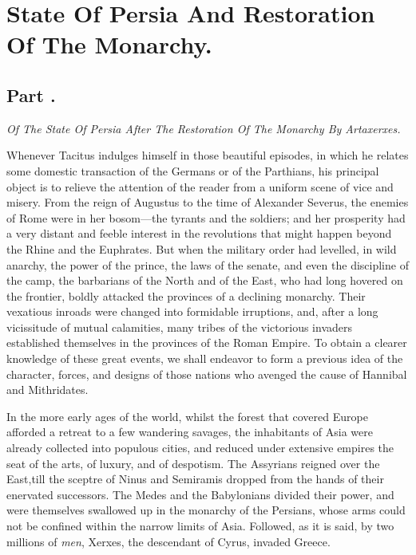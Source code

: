 \chapter{State Of Persia And Restoration Of The Monarchy.}
\section{Part \thesection.}

\textit{Of The State Of Persia After The Restoration Of The Monarchy By Artaxerxes.}
\vspace{\onelineskip}

Whenever Tacitus indulges himself in those beautiful episodes, in
which he relates some domestic transaction of the Germans or of
the Parthians, his principal object is to relieve the attention
of the reader from a uniform scene of vice and misery. From the
reign of Augustus to the time of Alexander Severus, the enemies
of Rome were in her bosom—the tyrants and the soldiers; and her
prosperity had a very distant and feeble interest in the
revolutions that might happen beyond the Rhine and the Euphrates.
But when the military order had levelled, in wild anarchy, the
power of the prince, the laws of the senate, and even the
discipline of the camp, the barbarians of the North and of the
East, who had long hovered on the frontier, boldly attacked the
provinces of a declining monarchy. Their vexatious inroads were
changed into formidable irruptions, and, after a long vicissitude
of mutual calamities, many tribes of the victorious invaders
established themselves in the provinces of the Roman Empire. To
obtain a clearer knowledge of these great events, we shall
endeavor to form a previous idea of the character, forces, and
designs of those nations who avenged the cause of Hannibal and
Mithridates.

In the more early ages of the world, whilst the forest that
covered Europe afforded a retreat to a few wandering savages, the
inhabitants of Asia were already collected into populous cities,
and reduced under extensive empires the seat of the arts, of
luxury, and of despotism. The Assyrians reigned over the East,\footnotemark[1]
till the sceptre of Ninus and Semiramis dropped from the hands of
their enervated successors. The Medes and the Babylonians divided
their power, and were themselves swallowed up in the monarchy of
the Persians, whose arms could not be confined within the narrow
limits of Asia. Followed, as it is said, by two millions of
\textit{men}, Xerxes, the descendant of Cyrus, invaded Greece.

